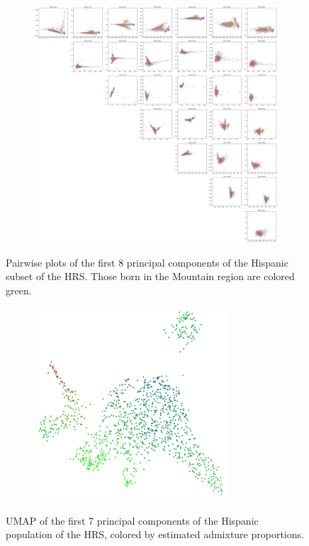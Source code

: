 \documentclass[12pt]{pnas-new}
\begin{document}
\begin{figure}
    \centering
    \begin{subfigure}{\textwidth}
    \includegraphics[width=\textwidth]{images/HRS_PCGRID_8.pdf}
    \end{subfigure}
    \caption{Pairwise plots of the first 8 principal components of the Hispanic subset of the HRS. Those born in the Mountain region are colored green.}
    \label{fig:supp_hrs_hisp_grid}
\end{figure}

\begin{figure}
    \centering
    \begin{subfigure}{\textwidth}
    \includegraphics[width=0.8\textwidth]{images/HRS_1000G_NP1_UMAP_PC7_NC2_NN15_MD05_pca_hrshisp_added1kgp_2018115153245_admix.pdf}
    \end{subfigure}
    \caption{UMAP of the first 7 principal components of the Hispanic population of the HRS, colored by estimated admixture proportions.}
    \label{fig:supp_umap_hrs_hisp_admix}
\end{figure}
\end{document}
